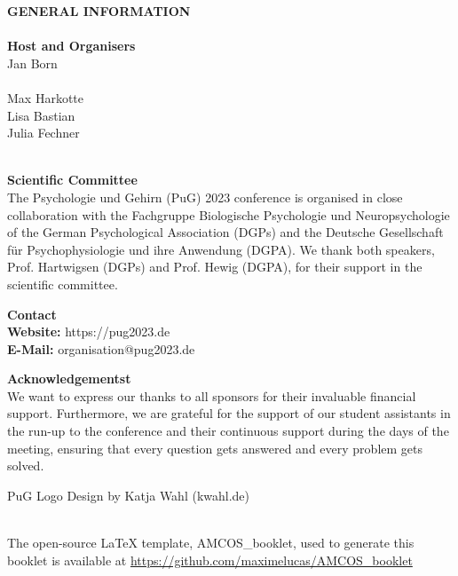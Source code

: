 \vspace*{1cm}
\begin{center}
	\textbf{GENERAL INFORMATION} \\
	\ \\[\baselineskip]

	\textcolor{\primarycolor}{\textbf{Host and Organisers}}	 \\
	Jan Born \\
	\ \\[\baselineskip]
	Max Harkotte \\
	Lisa Bastian \\
	Julia Fechner \\
	\ \\[\baselineskip]
	\vspace*{0.5cm}
	
	\textcolor{\primarycolor}{\textbf {Scientific Committee}}	 \\
	The Psychologie und Gehirn (PuG) 2023 conference is organised in close collaboration with the Fachgruppe Biologische Psychologie und Neuropsychologie of the German Psychological Association (DGPs) and the Deutsche Gesellschaft für Psychophysiologie und ihre Anwendung (DGPA). We thank both speakers, Prof. Hartwigsen (DGPs) and Prof. Hewig (DGPA), for their support in the scientific committee.
	\\[\baselineskip]
	\vspace*{0.5cm}

	\textcolor{\primarycolor}{\textbf {Contact}}	 \\
	\textbf{Website:} https://pug2023.de \\
	\textbf{E-Mail:} organisation@pug2023.de
	\\[\baselineskip]
	\vspace*{0.5cm}

	\textcolor{\primarycolor}{\textbf {Acknowledgementst}}	 \\
	We want to express our thanks to all sponsors for their invaluable financial support. Furthermore, we are grateful for the support of our student assistants in the run-up to the conference and their continuous support during the days of the meeting, ensuring that every question gets answered and every problem gets solved.

	PuG Logo Design by Katja Wahl (kwahl.de)

\end{center}
\mbox{}
\thispagestyle{empty}
\vfill
\begin{center}
	\ \\[20pt] %
	The open-source \LaTeX{} template, AMCOS\_booklet, used to generate this booklet is available at \url{https://github.com/maximelucas/AMCOS\_booklet}
\end{center}

\newpage